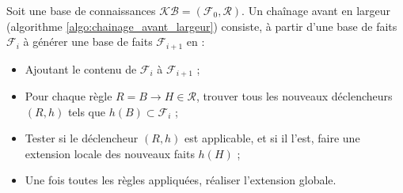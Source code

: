 Soit une base de connaissances $\mathcal{KB} = (\mathcal{F}_0, \mathcal{R})$. Un chaînage avant en largeur (algorithme  \ref{algo:chainage_avant_largeur}) consiste, à partir d'une base de faits $\mathcal{F}_i$ à générer une base de faits $\mathcal{F}_{i+1}$ en :
\begin{itemize}
    \item Ajoutant le contenu de $\mathcal{F}_{i}$ à $\mathcal{F}_{i+1}$ ;
    \item Pour chaque règle $R = B \rightarrow H \in \mathcal{R}$, trouver tous les nouveaux déclencheurs $(R,h)$ tels que $h(B) \subset \mathcal{F}_i$ ;
    \item Tester si le déclencheur $(R,h)$ est applicable, et si il l'est, faire une extension locale des nouveaux faits $h(H)$ ;
    \item Une fois toutes les règles appliquées, réaliser l'extension globale.
\end{itemize}



